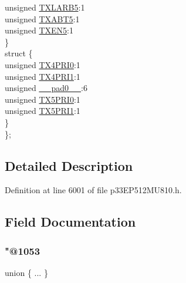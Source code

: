 \begin{DoxyCompactItemize}
\begin{tabbing}
\>\>unsigned \hyperlink{structtag_c2_t_r45_c_o_n_b_i_t_s_a8c1c239200afa1f955c5c4bc6b605c31}{TXLARB5}:1\\
\>\>unsigned \hyperlink{structtag_c2_t_r45_c_o_n_b_i_t_s_a6ae03d5a9518c606215c03edf9add7b8}{TXABT5}:1\\
\>\>unsigned \hyperlink{structtag_c2_t_r45_c_o_n_b_i_t_s_ae76ce39447cf8b46fd18c54522ed7864}{TXEN5}:1\\
\>\} \\
\>struct \{\\
\>\>unsigned \hyperlink{structtag_c2_t_r45_c_o_n_b_i_t_s_a2ca298d34b532e067bfe454f9bb980c5}{TX4PRI0}:1\\
\>\>unsigned \hyperlink{structtag_c2_t_r45_c_o_n_b_i_t_s_ae2c490c19ec502d0fa63d677df0a8397}{TX4PRI1}:1\\
\>\>unsigned \hyperlink{structtag_c2_t_r45_c_o_n_b_i_t_s_adf71f3d8410c1f1dbbc96680a92c49af}{\_\_pad0\_\_}:6\\
\>\>unsigned \hyperlink{structtag_c2_t_r45_c_o_n_b_i_t_s_abd45feebb18858a80521772247bec761}{TX5PRI0}:1\\
\>\>unsigned \hyperlink{structtag_c2_t_r45_c_o_n_b_i_t_s_a147ce4c79f3c3229e00f431795d9cfe1}{TX5PRI1}:1\\
\>\} \\
\}; \\

\end{tabbing}\end{DoxyCompactItemize}


\subsection{Detailed Description}


Definition at line 6001 of file p33\+E\+P512\+M\+U810.\+h.



\subsection{Field Documentation}
\mbox{\label{structtag_c2_t_r45_c_o_n_b_i_t_s_a4dbfe56cadb4b2769828bfb3f90ff5c1}} 
\subsubsection{\texorpdfstring{"@1053}{@1053}}
{\footnotesize\ttfamily union \{ ... \} }

\mbox{\label{structtag_c2_t_r45_c_o_n_b_i_t_s_adf71f3d8410c1f1dbbc96680a92c49af}} 
